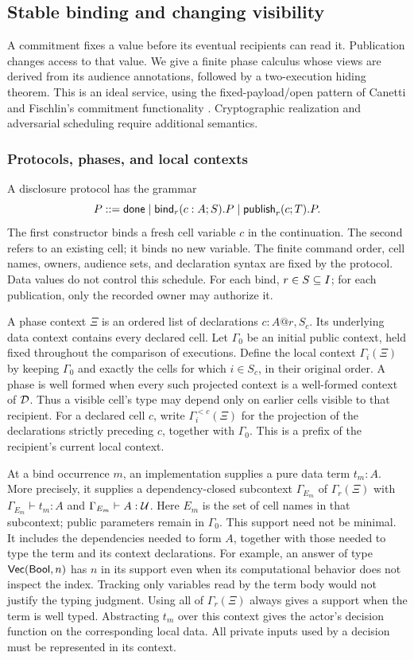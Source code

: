 \subsection{Stable binding and changing visibility}
\label{sec:disclosure}

A commitment fixes a value before its eventual recipients can read it.
Publication changes access to that value. We give a finite phase calculus
whose views are derived from its audience annotations, followed by a
two-execution hiding theorem. This is an ideal service, using the
fixed-payload/open pattern of Canetti and Fischlin's commitment functionality
\cite{CanettiFischlin2001}. Cryptographic realization and adversarial
scheduling require additional semantics.

\subsubsection{Protocols, phases, and local contexts}

A disclosure protocol has the grammar
\[
 P::=\mathsf{done}
   \mid \mathsf{bind}_r(c:A;S).P
   \mid \mathsf{publish}_r(c;T).P.
\]
The first constructor binds a fresh cell variable $c$ in the continuation.
The second refers to an existing cell; it binds no new variable.
The finite command order, cell names, owners, audience sets, and declaration
syntax are fixed by the protocol. Data values do not control this schedule.
For each bind, $r\in S\subseteq I$; for each publication, only the
recorded owner may authorize it.

A phase context $\Xi$ is an ordered list of declarations
$c:A@r,S_c$. Its underlying data context contains every declared cell.
Let $\Gamma_0$ be an initial public context, held fixed throughout the
comparison of executions. Define the local context $\Gamma_i(\Xi)$ by
keeping $\Gamma_0$ and exactly the cells for which $i\in S_c$, in their
original order. A phase is well formed when every such projected context
is a well-formed context of $\mathcal D$. Thus a visible cell's type may depend
only on earlier cells visible to that recipient.
For a declared cell $c$, write $\Gamma_i^{<c}(\Xi)$ for the projection
of the declarations strictly preceding $c$, together with $\Gamma_0$.
This is a prefix of the recipient's current local context.

At a bind occurrence $m$, an implementation supplies a pure data term
$t_m:A$. More precisely, it supplies a dependency-closed subcontext
$\Gamma_{E_m}$ of $\Gamma_r(\Xi)$ with
$\Gamma_{E_m}\vdash t_m:A$ and $\Gamma_{E_m}\vdash A:\mathcal U$.
Here $E_m$ is the set of cell names in that subcontext; public parameters
remain in $\Gamma_0$. This support need not be minimal.
It includes the dependencies needed to form $A$, together with those
needed to type the term and its context declarations. For example,
an answer of type $\mathsf{Vec}(\mathsf{Bool},n)$ has $n$ in its support even
when its computational behavior does not inspect the index. Tracking
only variables read by the term body would not justify the typing judgment.
Using all of $\Gamma_r(\Xi)$ always gives a support when the term is
well typed. Abstracting $t_m$ over this context gives the actor's decision
function on the corresponding local data. All private inputs used by a
decision must be represented in its context.

